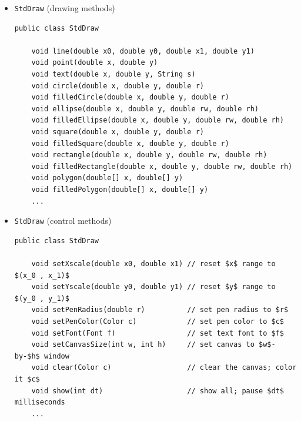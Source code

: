 \documentclass[8pt,a4paper,compress]{beamer}
\begin{document}
\begin{frame}[fragile]
\begin{itemize}
\item \lstinline{StdDraw} (drawing methods)
\begin{lstlisting}[language={},mathescape]
public class StdDraw

    void line(double x0, double y0, double x1, double y1)
    void point(double x, double y)
    void text(double x, double y, String s)
    void circle(double x, double y, double r)
    void filledCircle(double x, double y, double r)
    void ellipse(double x, double y, double rw, double rh)
    void filledEllipse(double x, double y, double rw, double rh)
    void square(double x, double y, double r)
    void filledSquare(double x, double y, double r)
    void rectangle(double x, double y, double rw, double rh)
    void filledRectangle(double x, double y, double rw, double rh)
    void polygon(double[] x, double[] y)
    void filledPolygon(double[] x, double[] y)
    ...
\end{lstlisting}

\item \lstinline{StdDraw} (control methods)
\begin{lstlisting}[language={},mathescape]
public class StdDraw

    void setXscale(double x0, double x1) // reset $x$ range to $(x_0 , x_1)$
    void setYscale(double y0, double y1) // reset $y$ range to $(y_0 , y_1)$
    void setPenRadius(double r)          // set pen radius to $r$
    void setPenColor(Color c)            // set pen color to $c$
    void setFont(Font f)                 // set text font to $f$
    void setCanvasSize(int w, int h)     // set canvas to $w$-by-$h$ window
    void clear(Color c)                  // clear the canvas; color it $c$
    void show(int dt)                    // show all; pause $dt$ milliseconds
    ...
\end{lstlisting}
\end{itemize}
\end{frame}
\end{document}
